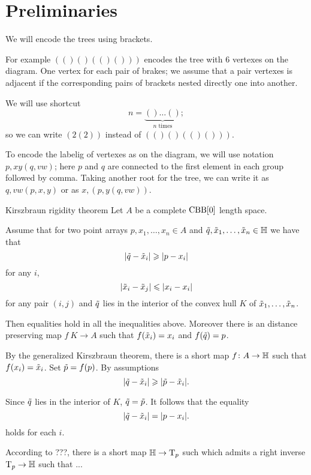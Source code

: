 \section{Preliminaries}

We will encode the trees using brackets.

\hide
\begin{wrapfigure}{r}{15 mm}
\end{wrapfigure}
\unhide

For example $(()()(()()))$ encodes the tree with 6 vertexes on the diagram. 
One vertex for each pair of brakes;
we assume that a pair vertexes is adjacent if the corresponding pairs of brackets nested directly one into another.

We will use shortcut
\[n=\underbrace{()\dots()}_{n\text{ times}};\]
so we can write $(2(2))$ instead of $(()()(()()))$.

To encode the labelig of vertexes as on the diagram, we will use notation $p,xy(q,vw)$;
here $p$ and $q$ are connected to the first element in each group followed by comma.
Taking another root for the tree, we can write it as $q,vw(p,x,y)$ or as $x,(p,y(q,vw))$.

\begin{thm}{Kirszbraun rigidity theorem}\label{thm:kirszbraun-rigid}
Let $A$ be a complete $\CBB[0]$ length space.

Assume that for two point arrays $p,x_1,\dots,x_n\in A$ and $\~q, \~x_1,\dots,\~x_n\in \HH$ we have that 
\[|\~q-\~x_i|\ge |p-x_i|\]
for any $i$,
\[|\~x_i-\~x_j|\le |x_i-x_i|\]
for any pair $(i,j)$
and $\~q$ lies in the interior of the convex hull $K$ of $\~x_1,\dots,\~x_n$.

Then equalities hold in all the inequalities above.
Moreover there is an distance preserving map $f\:K\to A$ such that $f(\~x_i)=x_i$ and $f(\~q)=p$. 
\end{thm}

By the generalized Kirszbraun theorem, there is a short map $f\:A\to \HH$
such that $f(x_i)=\~x_i$.
Set  $\~p=f(p)$.
By assumptions
\[|\~q-\~x_i|\ge |\~p-\~x_i|.\]

Since $\~q$ lies in the interior of $K$, $\~q=\~p$.
It follows that the equality 
\[|\~q-\~x_i|= |p-x_i|.\]
holds for each $i$.

According to ???, there is a short map $\HH\to \T_p$ such which admits a right inverse $\T_p\to \HH$ such that ...



\qeds